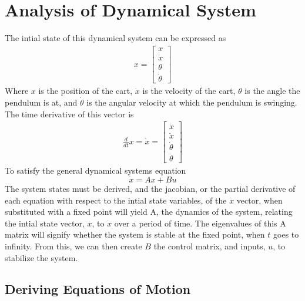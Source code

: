 \documentclass{article}
\begin{document}
\section{Analysis of Dynamical System}
The intial state of this dynamical system can be expressed as 
\begin{align*}
    x = \begin{bmatrix}
        x\\
        \dot{x}\\
        \theta\\
        \dot{\theta}
    \end{bmatrix}
\end{align*}
Where $x$ is the position of the cart, $\dot{x}$ is the velocity of the cart, $\theta$ is the angle
the pendulum is at, and $\dot{\theta}$ is the angular velocity at which the pendulum is swinging.
The time derivative of this vector is
\begin{align*}
    \frac{d}{dt}x = \dot{x} = \begin{bmatrix}
        \dot{x}\\
        \ddot{x}\\
        \dot{\theta}\\
        \ddot{\theta}
    \end{bmatrix}
\end{align*}
To satisfy the general dynamical systems equation
\[\dot{x}=Ax+Bu\]
The system states must be derived, and the jacobian, or the partial derivative of each equation with 
respect to the intial state variables, of the $\dot{x}$ vector, when substituted with a fixed point will yield A, the dynamics of
the system, relating the intial state vector, $x$, to $\dot{x}$ over a period of time. The eigenvalues of 
this A matrix will signify whether the system is stable at the fixed point, when $t$ goes to infinity. From this,
we can then create $B$ the control matrix,  and inputs, $u$, to stabilize the system. 
\subsection{Deriving Equations of Motion}
\end{document}
